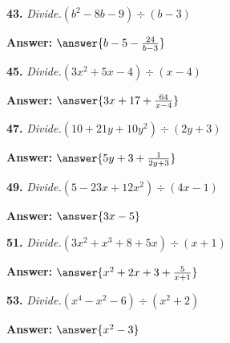 \documentclass{ximera}
\begin{document}
\begin{problem}
\textbf{43.} \emph{Divide.}\quad $(b^2 - 8b - 9) \div (b - 3)$

\textbf{Answer:} $\answer{b -5 -\frac{24}{b-3}}$
\end{problem}

\begin{problem}
\textbf{45.} \emph{Divide.}\quad $(3x^2 + 5x - 4) \div (x - 4)$

\textbf{Answer:} $\answer{3x +17 +\frac{64}{x-4}}$
\end{problem}

\begin{problem}
\textbf{47.} \emph{Divide.}\quad $(10 + 21y + 10y^2) \div (2y + 3)$

\textbf{Answer:} $\answer{5y +3 +\frac{1}{2y+3}}$
\end{problem}

\begin{problem}
\textbf{49.} \emph{Divide.}\quad $(5 - 23x + 12x^2) \div (4x - 1)$

\textbf{Answer:} $\answer{3x -5}$
\end{problem}

\begin{problem}
\textbf{51.} \emph{Divide.}\quad $(3x^2 + x^3 + 8 + 5x) \div (x + 1)$

\textbf{Answer:} $\answer{x^2 +2x +3 +\frac{5}{x+1}}$
\end{problem}

\begin{problem}
\textbf{53.} \emph{Divide.}\quad $(x^4 - x^2 - 6) \div (x^2 + 2)$

\textbf{Answer:} $\answer{x^2 -3}$
\end{problem}
\end{document}
